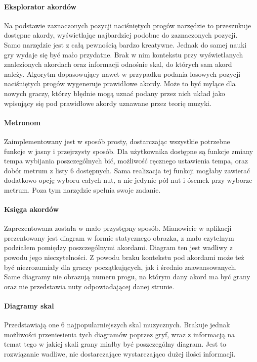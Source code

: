 \paragraph{Eksplorator akordów}
Na podstawie zaznaczonych pozycji naciśniętych progów narzędzie to przeszukuje dostępne akordy, wyświetlając najbardziej podobne do zaznaczonych pozycji. Samo narzędzie jest z całą pewnością bardzo kreatywne. Jednak do samej nauki gry wydaje się być mało przydatne. Brak w nim kontekstu przy wyświetlanych znalezionych akordach oraz informacji odnośnie skal, do których sam akord należy. Algorytm dopasowujący nawet w przypadku podania losowych pozycji naciśniętych progów wygeneruje prawidłowe akordy. Może to być mylące dla nowych graczy, którzy błędnie mogą uznać podany przez nich układ jako wpisujący się pod prawidłowe akordy uznawane przez teorię muzyki.

\paragraph{Metronom}
Zaimplementowany jest w sposób prosty, dostarczając wszystkie potrzebne funkcje w jasny i przejrzysty sposób. Dla użytkownika dostępne są funkcje zmiany tempa wybijania poszczególnych bić, możliwość ręcznego ustawienia tempa, oraz dobór metrum z listy 6 dostępnych. Sama realizacja tej funkcji mogłaby zawierać dodatkowo opcję wyboru całych nut, a nie jedynie pół nut i ósemek przy wyborze metrum. Poza tym narzędzie spełnia swoje zadanie.

\paragraph{Księga akordów}

Zaprezentowana została w mało przystępny sposób. Mianowicie w aplikacji prezentowany jest diagram w formie statycznego obrazka, z mało czytelnym podziałem pomiędzy poszczególnymi akordami. Diagram ten jest wadliwy z powodu jego nieczytelności. Z powodu braku kontekstu pod akordami może też być niezrozumiały dla graczy początkujących, jak i średnio zaawansowanych. Same diagramy nie obrazują numeru progu, na którym dany akord ma być grany oraz nie przedstawia nuty odpowiadającej danej strunie.

\paragraph{Diagramy skal}
Przedstawiają one 6 najpopularniejszych skal muzycznych. Brakuje jednak możliwości przeniesienia tych diagramów poprzez gryf, wraz z informacją na temat tego w jakiej skali grany miałby być poszczególny diagram. Jest to rozwiązanie wadliwe, nie dostarczające wystarczająco dużej ilości informacji. \\


